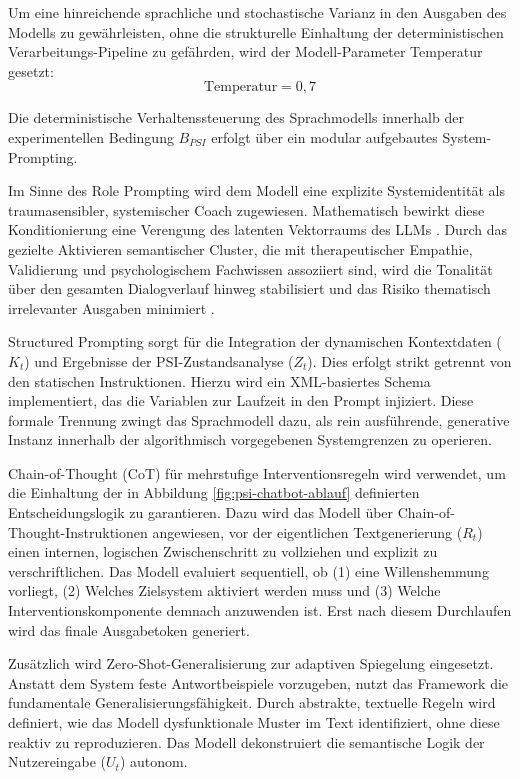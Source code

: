 Um eine hinreichende sprachliche und stochastische Varianz in den Ausgaben des Modells zu gewährleisten, ohne die strukturelle Einhaltung der deterministischen Verarbeitungs-Pipeline zu gefährden, wird der Modell-Parameter Temperatur gesetzt:
\begin{equation}
    \text{Temperatur} = 0{,}7
\end{equation}


Die deterministische Verhaltenssteuerung des Sprachmodells innerhalb der experimentellen Bedingung $B_{PSI}$ erfolgt über ein modular aufgebautes System-Prompting. 

Im Sinne des Role Prompting wird dem Modell eine explizite Systemidentität als traumasensibler, systemischer Coach zugewiesen. Mathematisch bewirkt diese Konditionierung eine Verengung des latenten Vektorraums des LLMs \citep{kong2024better}. Durch das gezielte Aktivieren semantischer Cluster, die mit therapeutischer Empathie, Validierung und psychologischem Fachwissen assoziiert sind, wird die Tonalität über den gesamten Dialogverlauf hinweg stabilisiert und das Risiko thematisch irrelevanter Ausgaben minimiert \citep{hu2026expert}.
    
Structured Prompting sorgt für die Integration der dynamischen Kontextdaten ($K_t$) und Ergebnisse der PSI-Zustandsanalyse ($Z_t$). Dies erfolgt strikt getrennt von den statischen Instruktionen. Hierzu wird ein XML-basiertes Schema implementiert, das die Variablen zur Laufzeit in den Prompt injiziert.
Diese formale Trennung zwingt das Sprachmodell dazu, als rein ausführende, generative Instanz innerhalb der algorithmisch vorgegebenen Systemgrenzen zu operieren.

Chain-of-Thought (CoT) für mehrstufige Interventionsregeln wird verwendet, um die Einhaltung der in Abbildung \ref{fig:psi-chatbot-ablauf} definierten Entscheidungslogik zu garantieren. Dazu wird das Modell über Chain-of-Thought-Instruktionen angewiesen, vor der eigentlichen Textgenerierung ($R_t$) einen internen, logischen Zwischenschritt zu vollziehen und explizit zu verschriftlichen. Das Modell evaluiert sequentiell, ob (1) eine Willenshemmung vorliegt, (2) Welches Zielsystem aktiviert werden muss und (3) Welche Interventionskomponente demnach anzuwenden ist. Erst nach diesem Durchlaufen wird das finale Ausgabetoken generiert.
    
Zusätzlich wird Zero-Shot-Generalisierung zur adaptiven Spiegelung eingesetzt. Anstatt dem System feste Antwortbeispiele vorzugeben, nutzt das Framework die fundamentale Generalisierungsfähigkeit. Durch abstrakte, textuelle Regeln wird definiert, wie das Modell dysfunktionale Muster im Text identifiziert, ohne diese reaktiv zu reproduzieren. Das Modell dekonstruiert die semantische Logik der Nutzereingabe ($U_t$) autonom.


